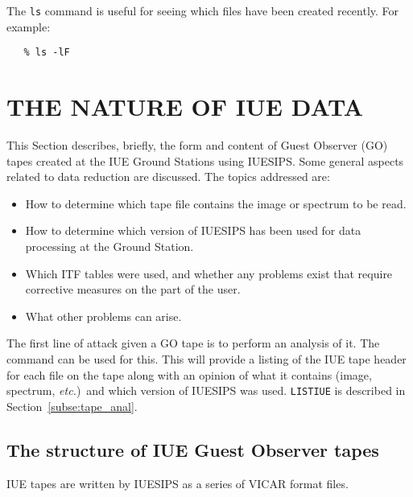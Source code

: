 The \verb+ls+ command is useful for seeing which files have been created
recently.
For example:

\begin{verbatim}
   % ls -lF
\end{verbatim}


\section{\label{se:nature}THE NATURE OF IUE DATA}

This Section describes, briefly, the form and content of Guest Observer
(GO) tapes created at the IUE Ground Stations using IUESIPS\@.
Some general aspects related to data reduction are discussed.
The topics addressed are:

\begin{itemize}

\item How to determine which tape file contains the image or spectrum to be
      read.

\item How to determine which version of IUESIPS has been used for data
      processing at the Ground Station.

\item Which ITF tables were used, and whether any problems exist that require
      corrective measures on the part of the user.

\item What other problems can arise.

\end{itemize}

The first line of attack given a GO tape is to perform an analysis of it.
The 
 command can be used for this.
This will provide a listing of the IUE tape header for each file on the tape
along with an opinion of what it contains (image, spectrum, {\it etc.})\ and
which version of IUESIPS was used.
\verb+LISTIUE+ is described in Section~\ref{subse:tape_anal}\@.


\subsection{The structure of IUE Guest Observer tapes}

IUE tapes are written by IUESIPS as a series of VICAR format files.

